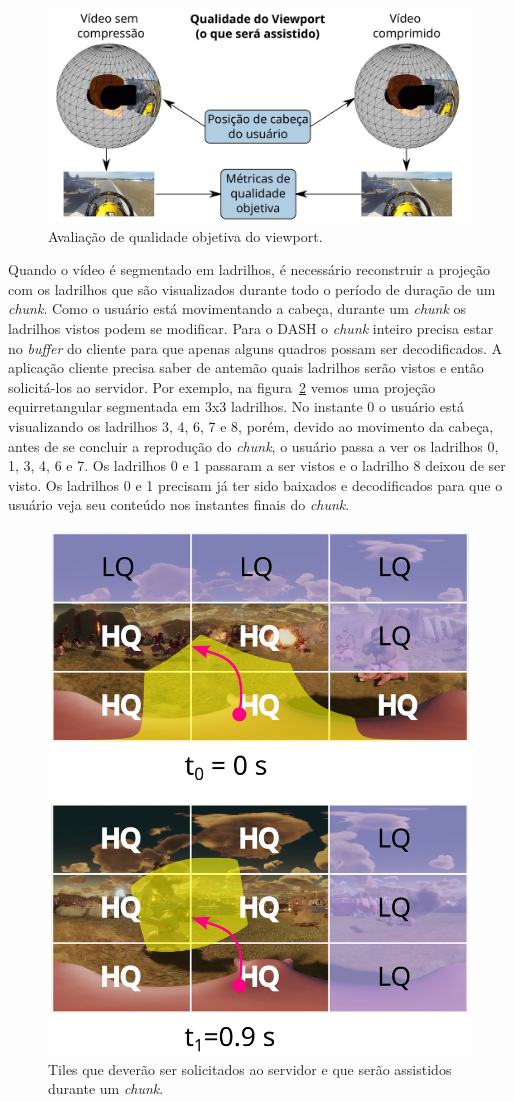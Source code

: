 \begin{figure}[ht]
        \centering
        \includegraphics[width=0.8\linewidth]{fig/Project_Quality_Workflow_2.png}
        \caption{Avaliação de qualidade objetiva do viewport.}
        \label{fig:QualityWorkflow}
\end{figure}

Quando o vídeo é segmentado em ladrilhos, é necessário reconstruir a projeção com os ladrilhos que são visualizados durante todo o período de duração de um \textit{chunk}. Como o usuário está movimentando a cabeça, durante um \textit{chunk} os ladrilhos vistos podem se modificar. Para o DASH o \textit{chunk} inteiro precisa estar no \textit{buffer} do cliente para que apenas alguns quadros possam ser decodificados. A aplicação cliente precisa saber de antemão quais ladrilhos serão vistos e então solicitá-los ao servidor. Por exemplo, na figura~\ref{fig:selectTiles} vemos uma projeção equirretangular segmentada em 3x3 ladrilhos. No instante 0 o usuário está visualizando os ladrilhos 3, 4, 6, 7 e 8, porém, devido ao movimento da cabeça, antes de se concluir a reprodução do \textit{chunk}, o usuário passa a ver os ladrilhos 0, 1, 3, 4, 6 e 7. Os ladrilhos 0 e 1 passaram a ser vistos e o ladrilho 8 deixou de ser visto. Os ladrilhos 0 e 1 precisam já ter sido baixados e decodificados para que o usuário veja seu conteúdo nos instantes finais do \textit{chunk}.

\begin{figure}[h]
        \centering
        \includegraphics[width=0.5\linewidth]{fig/Streaming of Tiles 2.png}
        \caption{Tiles que deverão ser solicitados ao servidor e que serão assistidos durante um \textit{chunk}.}
        \label{fig:selectTiles}
\end{figure}

